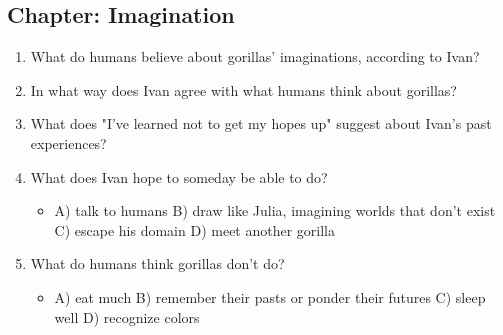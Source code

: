 \documentclass[11pt]{article}
\begin{document}
\subsection*{Chapter: Imagination}
\begin{enumerate}
  \item What do humans believe about gorillas' imaginations, according to Ivan?
  \vspace{0.5in}
  \item In what way does Ivan agree with what humans think about gorillas?
  \vspace{0.5in}
  \item What does "I've learned not to get my hopes up" suggest about Ivan's past experiences?
  \vspace{0.5in}
  \item What does Ivan hope to someday be able to do?
  \begin{itemize}\setlength\itemsep{0pt}
    \item[] A) talk to humans \quad B) draw like Julia, imagining worlds that don't exist \quad C) escape his domain \quad D) meet another gorilla
  \end{itemize}
  \item What do humans think gorillas don't do?
  \begin{itemize}\setlength\itemsep{0pt}
    \item[] A) eat much \quad B) remember their pasts or ponder their futures \quad C) sleep well \quad D) recognize colors
  \end{itemize}
\end{enumerate}
\end{document}
